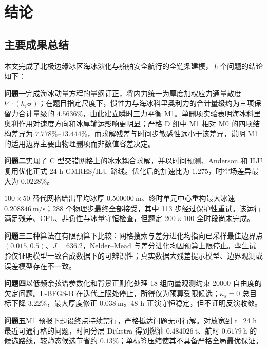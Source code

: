 \documentclass[UTF8]{ctexart}
\newcommand{\vect}[1]{\boldsymbol{#1}}
\begin{document}
\section{结论}

\subsection{主要成果总结}

本文完成了北极边缘冰区海冰演化与船舶安全航行的全链条建模，五个问题的结论如下：

\par \textbf{问题一}完成海冰动量方程的量纲订正，将内力统一为厚度加权应力通量散度 $\nabla\cdot(h_i\vect\sigma)$；在题目指定尺度下，惯性力与海冰科里奥利力的合计量级约为三项保留力合计量级的 $4.5636\%$，由此建立瞬时三力平衡 M1。单删项实验表明海冰科里奥利作用对速度方向和冰厚输运影响更明显；严格 D 组中 M1 相对 M0 的四项结构差异为 $7.778\%$--$13.444\%$，而求解残差与时间步敏感性远小于该差异，说明 M1 的适用边界主要由物理删项而非数值容差决定。

\par \textbf{问题二}实现了 C 型交错网格上的冰水耦合求解，并以时间预测、Anderson 和 ILU 复用优化正式 24 h GMRES/ILU 路线。优化后的加速比为 $1.275$，时空场差异最大为 $0.0228\%$。

$100\times50$ 替代网格给出平均冰厚 $0.500000\ \mathrm m$、终时单元中心重构最大冰速 $0.208846\ \mathrm{m/s}$；288 个物理步最终全部接受，其中 113 步经过保护性重试。该运行满足残差、CFL、非负性与冰量守恒检查，但题定 $200\times100$ 全时段尚未完成。

\par \textbf{问题三}三种算法在有限预算下比较：网格搜索与差分进化均指向已采样最佳边界点 $(0.015,0.5)$、$J=636.2$，Nelder--Mead 与差分进化均因预算上限停止。孪生试验仅证明模型一致合成数据下的可辨识性；真实数据大残差提示模型、边界观测或误差模型存在不一致。

\par \textbf{问题四}以低频余弦谱参数化和背景正则化处理 18 组向量观测约束 20000 自由度的欠定问题。L-BFGS-B 在迭代上限处停止，所得仅为预算受限候选；$\kappa_s=0$ 总目标下降 $3.22\%$，最大厚度修正 $0.038\ \mathrm m$。48 h 正演守恒稳定，但不证明反演收敛。

\par \textbf{问题五}M1 预报下题设终点持续禁行，严格抵达问题无可行解。对放宽到 t=24 h 最近可通行格的问题，时间分层 Dijkstra 得到燃油 $0.484026\ \mathrm t$、航时 $0.6179\ \mathrm h$ 的候选路线，较静态候选节省约 $0.13\%$；单标签压缩使其不具备严格全局最优保证。
\end{document}
